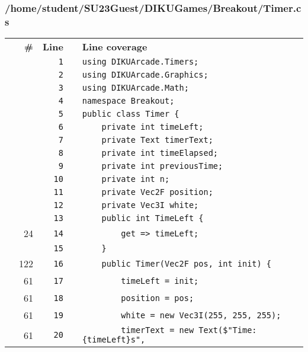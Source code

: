 \documentclass[a4paper,landscape,10pt]{article}
\begin{document}
\subsubsection{/home/student/SU23Guest/DIKUGames/Breakout/Timer.cs}
\begin{longtable}[l]{lrrll}
\textbf{} & \textbf{\#} & \textbf{Line} & \textbf{} & \textbf{Line coverage}\\
\cellcolor{gray} &  & \verb~1~ & & \verb~using DIKUArcade.Timers;~\\
\cellcolor{gray} &  & \verb~2~ & & \verb~using DIKUArcade.Graphics;~\\
\cellcolor{gray} &  & \verb~3~ & & \verb~using DIKUArcade.Math;~\\
\cellcolor{gray} &  & \verb~4~ & & \verb~namespace Breakout;~\\
\cellcolor{gray} &  & \verb~5~ & & \verb~public class Timer {~\\
\cellcolor{gray} &  & \verb~6~ & & \verb~    private int timeLeft;~\\
\cellcolor{gray} &  & \verb~7~ & & \verb~    private Text timerText;~\\
\cellcolor{gray} &  & \verb~8~ & & \verb~    private int timeElapsed;~\\
\cellcolor{gray} &  & \verb~9~ & & \verb~    private int previousTime;~\\
\cellcolor{gray} &  & \verb~10~ & & \verb~    private int n;~\\
\cellcolor{gray} &  & \verb~11~ & & \verb~    private Vec2F position;~\\
\cellcolor{gray} &  & \verb~12~ & & \verb~    private Vec3I white;~\\
\cellcolor{gray} &  & \verb~13~ & & \verb~    public int TimeLeft {~\\
\cellcolor{green} & 24 & \verb~14~ & & \verb~        get => timeLeft;~\\
\cellcolor{gray} &  & \verb~15~ & & \verb~    }~\\
\cellcolor{green} & 122 & \verb~16~ & & \verb~    public Timer(Vec2F pos, int init) {~\\
\cellcolor{green} & 61 & \verb~17~ & & \verb~        timeLeft = init;~\\
\cellcolor{green} & 61 & \verb~18~ & & \verb~        position = pos;~\\
\cellcolor{green} & 61 & \verb~19~ & & \verb~        white = new Vec3I(255, 255, 255);~\\
\cellcolor{green} & 61 & \verb~20~ & & \verb~        timerText = new Text($"Time: {timeLeft}s",~\\

\end{longtable}
\end{document}
